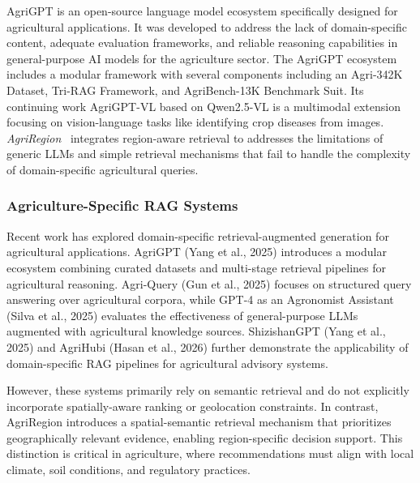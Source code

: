 \documentclass{ieeeaccess}
\newcommand{\AgriRegion}{\textit{AgriRegion}}
\begin{document}
AgriGPT \cite{yang2025agrigpt} is an open-source language model ecosystem specifically designed for agricultural applications. It was developed to address the lack of domain-specific content, adequate evaluation frameworks, and reliable reasoning capabilities in general-purpose AI models for the agriculture sector. 
The AgriGPT ecosystem includes a modular framework with several components including an  Agri-342K Dataset, Tri-RAG Framework, and AgriBench-13K Benchmark Suit. Its continuing work AgriGPT-VL \cite{yang2025agrigptvl} based on  Qwen2.5-VL is a multimodal extension focusing on vision-language tasks like identifying crop diseases from images. \AgriRegion~ integrates region-aware retrieval to addresses the limitations of generic LLMs and simple retrieval mechanisms that fail to handle the complexity of domain-specific agricultural queries.

\subsubsection{Agriculture-Specific RAG Systems}
Recent work has explored domain-specific retrieval-augmented generation 
for agricultural applications. AgriGPT (Yang et al., 2025) introduces 
a modular ecosystem combining curated datasets and multi-stage retrieval 
pipelines for agricultural reasoning. Agri-Query (Gun et al., 2025) focuses 
on structured query answering over agricultural corpora, while GPT-4 as an 
Agronomist Assistant (Silva et al., 2025) evaluates the effectiveness of 
general-purpose LLMs augmented with agricultural knowledge sources. 
ShizishanGPT (Yang et al., 2025) and AgriHubi (Hasan et al., 2026) further 
demonstrate the applicability of domain-specific RAG pipelines for 
agricultural advisory systems.

However, these systems primarily rely on semantic retrieval and do not 
explicitly incorporate spatially-aware ranking or geolocation constraints. 
In contrast, AgriRegion introduces a spatial-semantic retrieval mechanism 
that prioritizes geographically relevant evidence, enabling region-specific 
decision support. This distinction is critical in agriculture, where 
recommendations must align with local climate, soil conditions, and 
regulatory practices.
\end{document}

